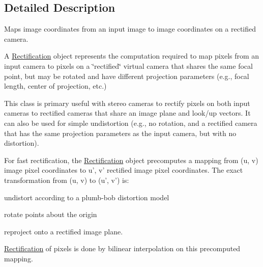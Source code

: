 \subsection{Detailed Description}
Maps image coordinates from an input image to image coordinates on a rectified camera. 

A \hyperlink{classfovis_1_1Rectification}{Rectification} object represents the computation required to map pixels from an input camera to pixels on a \char`\"{}rectified\char`\"{} virtual camera that shares the same focal point, but may be rotated and have different projection parameters (e.g., focal length, center of projection, etc.)

This class is primary useful with stereo cameras to rectify pixels on both input cameras to rectified cameras that share an image plane and look/up vectors. It can also be used for simple undistortion (e.g., no rotation, and a rectified camera that has the same projection parameters as the input camera, but with no distortion).

For fast rectification, the \hyperlink{classfovis_1_1Rectification}{Rectification} object precomputes a mapping from (u, v) image pixel coordinates to u', v' rectified image pixel coordinates. The exact transformation from (u, v) to (u', v') is:


\begin{DoxyEnumerate}
\item undistort according to a plumb-\/bob distortion model
\item rotate points about the origin
\item reproject onto a rectified image plane.
\end{DoxyEnumerate}

\hyperlink{classfovis_1_1Rectification}{Rectification} of pixels is done by bilinear interpolation on this precomputed mapping. 

